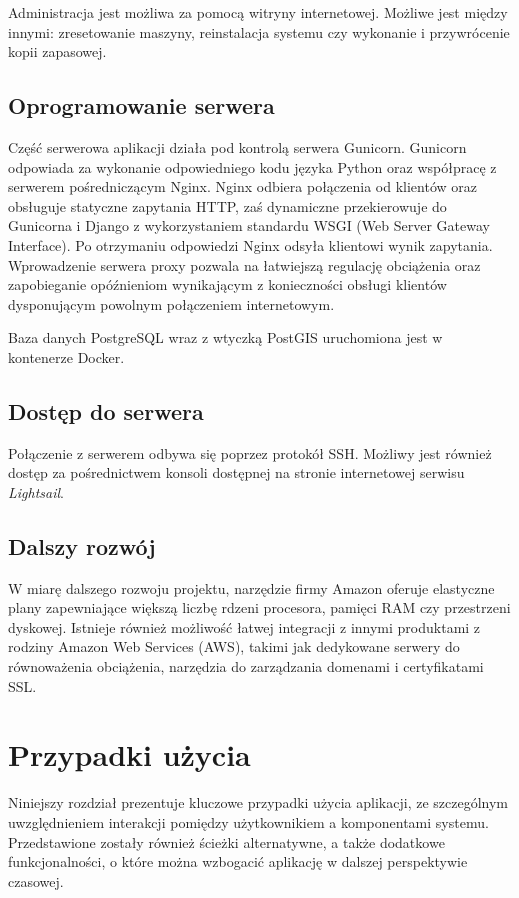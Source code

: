 \documentclass[licencjacka]{pracamgr}
\begin{document}
Administracja jest możliwa za pomocą witryny internetowej. Możliwe jest między innymi: zresetowanie maszyny, reinstalacja systemu czy wykonanie i przywrócenie kopii zapasowej.

\section{Oprogramowanie serwera}

Część serwerowa aplikacji działa pod kontrolą serwera Gunicorn. Gunicorn odpowiada za wykonanie odpowiedniego kodu języka Python oraz współpracę z serwerem pośredniczącym Nginx. Nginx odbiera połączenia od klientów oraz obsługuje statyczne zapytania HTTP, zaś dynamiczne przekierowuje do Gunicorna i Django z wykorzystaniem standardu WSGI (Web Server Gateway Interface). Po otrzymaniu odpowiedzi Nginx odsyła klientowi wynik zapytania. Wprowadzenie serwera proxy pozwala na łatwiejszą regulację obciążenia oraz zapobieganie opóźnieniom wynikającym z konieczności obsługi klientów dysponującym powolnym połączeniem internetowym.

Baza danych PostgreSQL wraz z wtyczką PostGIS uruchomiona jest w kontenerze Docker.

\section{Dostęp do serwera}
Połączenie z serwerem odbywa się poprzez protokół SSH\@. Możliwy jest również dostęp za pośrednictwem konsoli dostępnej na stronie internetowej serwisu \textit{Lightsail}.

\section{Dalszy rozwój}
W miarę dalszego rozwoju projektu, narzędzie firmy Amazon oferuje elastyczne plany zapewniające większą liczbę rdzeni procesora, pamięci RAM czy przestrzeni dyskowej. Istnieje również możliwość łatwej integracji z innymi produktami z rodziny Amazon Web Services (AWS), takimi jak dedykowane serwery do równoważenia obciążenia, narzędzia do zarządzania domenami i certyfikatami SSL\@.


\chapter{Przypadki użycia}\label{r:usecase}
Niniejszy rozdział prezentuje kluczowe przypadki użycia aplikacji, ze szczególnym uwzględnieniem interakcji pomiędzy użytkownikiem a komponentami systemu. Przedstawione zostały również ścieżki alternatywne, a także dodatkowe funkcjonalności, o które można wzbogacić aplikację w dalszej perspektywie czasowej.
\end{document}
